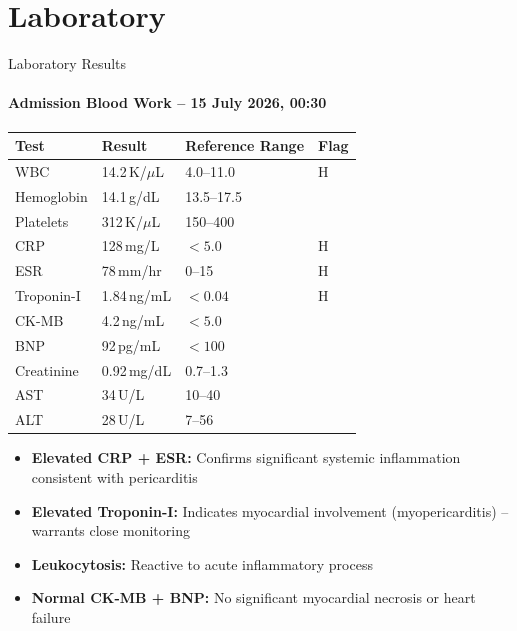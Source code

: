 \section{Laboratory}
\begin{frame}{Laboratory Results}
  \framesubtitle{Admission Blood Work -- 15 July 2026, 00:30}

  \begin{tcolorbox}[infobox,title={\faFlask\hspace{4pt}Serum Chemistry \& Hematology}]
    \small
    \renewcommand{\arraystretch}{1.2}
    \begin{tabular}{@{}llll@{}}
      \toprule
      \textbf{Test} & \textbf{Result} & \textbf{Reference Range} & \textbf{Flag} \\
      \midrule
      WBC           & 14.2\,K/$\mu$L    & 4.0--11.0               & \textcolor{alertred}{H} \\
      Hemoglobin    & 14.1\,g/dL        & 13.5--17.5              & \\
      Platelets     & 312\,K/$\mu$L     & 150--400                & \\
      CRP           & 128\,mg/L         & $<5.0$                  & \textcolor{alertred}{H} \\
      ESR           & 78\,mm/hr         & 0--15                   & \textcolor{alertred}{H} \\
      Troponin-I    & 1.84\,ng/mL       & $<0.04$                 & \textcolor{alertred}{H} \\
      CK-MB         & 4.2\,ng/mL        & $<5.0$                  & \\
      BNP           & 92\,pg/mL         & $<100$                  & \\
      Creatinine    & 0.92\,mg/dL       & 0.7--1.3                & \\
      AST           & 34\,U/L           & 10--40                  & \\
      ALT           & 28\,U/L           & 7--56                   & \\
      \bottomrule
    \end{tabular}
  \end{tcolorbox}

  \vspace{0.3cm}

  \begin{tcolorbox}[highlightbox,title={\faSearchPlus\hspace{4pt}Key Laboratory Findings}]
    \small
    \begin{itemize}
      \item \textbf{Elevated CRP + ESR:} Confirms significant systemic inflammation consistent with pericarditis
      \item \textbf{Elevated Troponin-I:} Indicates myocardial involvement (myopericarditis) -- warrants close monitoring
      \item \textbf{Leukocytosis:} Reactive to acute inflammatory process
      \item \textbf{Normal CK-MB + BNP:} No significant myocardial necrosis or heart failure
    \end{itemize}
  \end{tcolorbox}
\end{frame}
